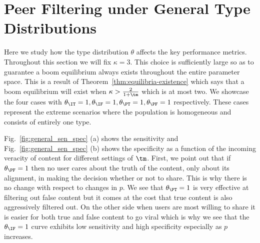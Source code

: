 




\section{Peer Filtering under General Type Distributions}\label{sec:gentyperes}
Here we study how the type distribution $\theta$ affects the key performance metrics. Throughout this section we will fix $\kappa=3$. This choice is sufficiently large so as to guarantee a boom equilibrium always exists throughout the entire parameter space. This is a result of Theorem~\ref{thm:equilibria-existence} which says that a boom equilibrium will exist when $\kappa > \frac{2}{1+\tm}$ which is at most two.   We showcase the four cases with $\theta_{\IT}=1, \theta_{\IF}=1, \theta_{\PT}=1, \theta_{\PF}=1$ respectively.  These cases represent the extreme scenarios where the population is homogeneous and consists of entirely one type.

Fig.~\ref{fig:general_sen_spec} (a) shows the sensitivity and Fig.~\ref{fig:general_sen_spec} (b) shows the specificity as a function of the incoming veracity of content for different settings of $\tm$.  First, we point out that if $\theta_{\PF}=1$ then no user cares about the truth of the content, only about its alignment, in making the decision whether or not to share. This is why there is no change with respect to changes in $p$.  We see that $\theta_{\PT} = 1$ is very effective at filtering out false content but it comes at the cost that true content is also aggressively filtered out. On the other side when users are most willing to share it is easier for both true and false content to go viral which is why we see that the $\theta_{\IF}=1$ curve exhibits low sensitivity and high specificity especially as $p$ increases. 


